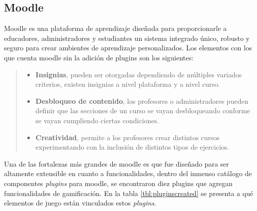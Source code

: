 \clearpage
\subsection*{Moodle}

 Moodle es una plataforma de aprendizaje diseñada para proporcionarle a educadores,
 administradores y estudiantes un sistema integrado único, robusto y seguro para crear
 ambientes de aprendizaje personalizados. Los elementos con los que cuenta moodle sin
 la adición de plugins son los siguientes:

 \begin{quote}
 \begin{itemize}
    \item {\bf Insignias}, pueden ser otorgadas dependiendo de múltiples variados
                criterios, existen insignias a nivel plataforma y a nivel curso.

    \item {\bf Desbloqueo de contenido}, los profesores o administradores pueden
                definir que las secciones de un curso se vayan desbloqueando
                conforme se vayan cumpliendo ciertas condiciones.

    \item {\bf Creatividad}, permite a los profesores crear distintos cursos
                experimentando con la inclusión de distintos tipos de ejercicios.
 \end{itemize}
 \end{quote}

 \noindent Una de las fortalezas más grandes de moodle es que fue diseñado para ser altamente
 extensible en cuanto a funcionalidades, dentro del inmenso catálogo de componentes {\it plugins}
 para moodle, se encontraron diez plugins que agregan funcionalidades de gamificación. En la tabla
 \ref{tbl:pluginscreated} se presenta a qué elementos de juego están vinculados estos {\it plugins}.


